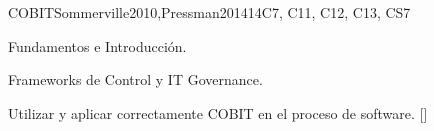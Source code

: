 \begin{syllabus}
\begin{unit}{}{COBIT}{Sommerville2010,Pressman2014}{14}{C7, C11, C12, C13, CS7}
\begin{topics}
    \item Fundamentos e Introducción.
    \item Frameworks de Control y IT Governance.
\end{topics}
\begin{learningoutcomes}
\item Utilizar y aplicar correctamente COBIT en el proceso de software. [\Usage]	
\end{learningoutcomes}
\end{unit}







\begin{coursebibliography}
\end{coursebibliography}

\end{syllabus}
